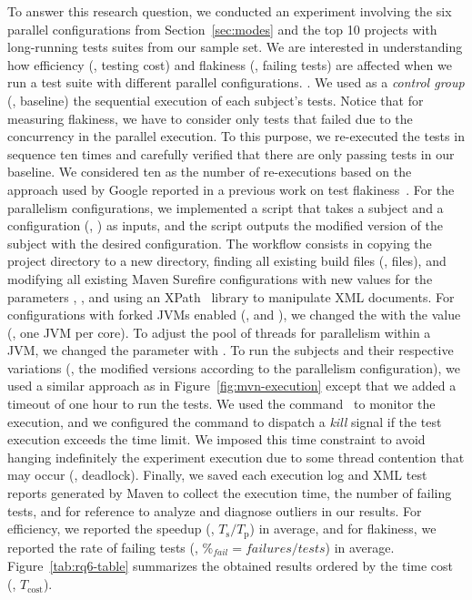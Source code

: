 To answer this research question, we conducted an experiment involving
the six parallel configurations from Section~\ref{sec:modes}  and the
top 10 projects with long-running tests suites from our sample set. We
are interested in understanding how efficiency (\ie, testing cost) and
flakiness (\ie, failing tests) are affected when we run a test suite
with different parallel configurations. .  We
used as a \emph{control group} (\ie, baseline) the sequential
execution of each subject's tests. Notice that for measuring
flakiness, we have to consider only tests that failed due to the
concurrency in the parallel execution. To this purpose, we re-executed
the tests in sequence ten times and carefully verified that there are
only passing tests in our baseline. We considered ten as the number of
re-executions based on the approach used by Google reported in a
previous work on test flakiness~\cite{luo-etal-fse2014}. For the
parallelism configurations, we implemented a script that takes a
subject and a configuration (\eg, \ForkSeq{}) as inputs, and the
script outputs the modified version of the subject with the desired
configuration. The workflow consists in copying the project directory
to a new directory, finding all existing build files (\ie, \pomf{}
files), and modifying all existing Maven Surefire configurations with
new values for the parameters , ,
and  using an XPath~\cite{xpath} library to
manipulate XML documents. For configurations with forked JVMs enabled
(\ie, \ForkSeq{} and \ForkParMeth{}), we changed the
 with the value  (\ie, one JVM per core).
To adjust the pool of threads for parallelism within a JVM, we changed
the parameter  with .  To run the subjects and their respective
variations (\ie, the modified versions according to the parallelism
configuration), we used a similar approach as in
Figure~\ref{fig:mvn-execution} except that we added a timeout of one
hour to run the tests. We used the 
command~\cite{timeout-cmd} to monitor the execution, and we configured
the command to dispatch a \emph{kill} signal if the test execution
exceeds the time limit. We imposed this time constraint to avoid
hanging indefinitely the experiment execution due to some thread
contention that may occur (\eg, deadlock). Finally, we saved each
execution log and XML test reports generated by Maven to collect the
execution time, the number of failing tests, and for reference to
analyze and diagnose outliers in our results. For efficiency, we
reported the speedup (\ie, $T_{\text{s}} / T_{\text{p}}$) in average,
and for flakiness, we reported the rate of failing tests (\ie,
$\mathit{\%_\text{fail} = failures / tests}$) in average.
Figure~\ref{tab:rq6-table} summarizes the obtained results ordered by
the time cost (\ie, $T_\text{cost}$).

